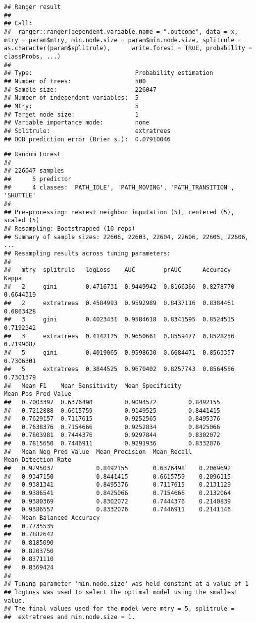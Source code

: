 \documentclass[]{article}
\begin{document}
\begin{verbatim}
## Ranger result
## 
## Call:
##  ranger::ranger(dependent.variable.name = ".outcome", data = x,      mtry = param$mtry, min.node.size = param$min.node.size, splitrule = as.character(param$splitrule),      write.forest = TRUE, probability = classProbs, ...) 
## 
## Type:                             Probability estimation 
## Number of trees:                  500 
## Sample size:                      226047 
## Number of independent variables:  5 
## Mtry:                             5 
## Target node size:                 1 
## Variable importance mode:         none 
## Splitrule:                        extratrees 
## OOB prediction error (Brier s.):  0.07910046
\end{verbatim}

\begin{verbatim}
## Random Forest 
## 
## 226047 samples
##      5 predictor
##      4 classes: 'PATH_IDLE', 'PATH_MOVING', 'PATH_TRANSITION', 'SHUTTLE' 
## 
## Pre-processing: nearest neighbor imputation (5), centered (5), scaled (5) 
## Resampling: Bootstrapped (10 reps) 
## Summary of sample sizes: 22606, 22603, 22604, 22606, 22605, 22606, ... 
## Resampling results across tuning parameters:
## 
##   mtry  splitrule   logLoss    AUC        prAUC      Accuracy   Kappa    
##   2     gini        0.4716731  0.9449942  0.8166366  0.8278770  0.6644319
##   2     extratrees  0.4584993  0.9592989  0.8437116  0.8384461  0.6863428
##   3     gini        0.4023431  0.9584618  0.8341595  0.8524515  0.7192342
##   3     extratrees  0.4142125  0.9650661  0.8559477  0.8528256  0.7199087
##   5     gini        0.4019065  0.9598630  0.6684471  0.8563357  0.7306301
##   5     extratrees  0.3844525  0.9670402  0.8257743  0.8564586  0.7301379
##   Mean_F1    Mean_Sensitivity  Mean_Specificity  Mean_Pos_Pred_Value
##   0.7003397  0.6376498         0.9094572         0.8492155          
##   0.7212888  0.6615759         0.9149525         0.8441415          
##   0.7629157  0.7117615         0.9252565         0.8495376          
##   0.7638376  0.7154666         0.9252834         0.8425066          
##   0.7803981  0.7444376         0.9297844         0.8302072          
##   0.7815650  0.7446911         0.9291936         0.8332076          
##   Mean_Neg_Pred_Value  Mean_Precision  Mean_Recall  Mean_Detection_Rate
##   0.9295037            0.8492155       0.6376498    0.2069692          
##   0.9347150            0.8441415       0.6615759    0.2096115          
##   0.9381341            0.8495376       0.7117615    0.2131129          
##   0.9386541            0.8425066       0.7154666    0.2132064          
##   0.9380369            0.8302072       0.7444376    0.2140839          
##   0.9386557            0.8332076       0.7446911    0.2141146          
##   Mean_Balanced_Accuracy
##   0.7735535             
##   0.7882642             
##   0.8185090             
##   0.8203750             
##   0.8371110             
##   0.8369424             
## 
## Tuning parameter 'min.node.size' was held constant at a value of 1
## logLoss was used to select the optimal model using the smallest value.
## The final values used for the model were mtry = 5, splitrule =
##  extratrees and min.node.size = 1.
\end{verbatim}
\end{document}
